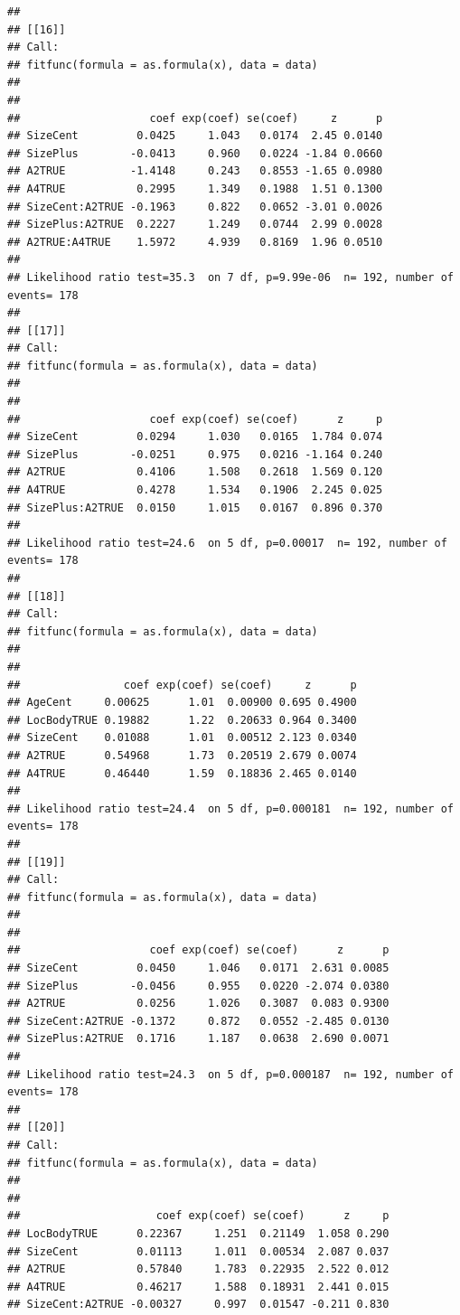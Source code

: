\documentclass{article}\usepackage[]{graphicx}\usepackage[]{color}
\makeatletter
\newenvironment{kframe}{%
 \def\at@end@of@kframe{}%
 \ifinner\ifhmode%
  \def\at@end@of@kframe{\end{minipage}}%
  \begin{minipage}{\columnwidth}%
 \fi\fi%
 \def\FrameCommand##1{\hskip\@totalleftmargin \hskip-\fboxsep
 \colorbox{shadecolor}{##1}\hskip-\fboxsep
     \hskip-\linewidth \hskip-\@totalleftmargin \hskip\columnwidth}%
 \MakeFramed {\advance\hsize-\width
   \@totalleftmargin\z@ \linewidth\hsize
   \@setminipage}}%
 {\par\unskip\endMakeFramed%
 \at@end@of@kframe}
\newenvironment{knitrout}{}{} %
\makeatother
\begin{document}
\begin{knitrout}
\begin{kframe}
\begin{verbatim}
## 
## [[16]]
## Call:
## fitfunc(formula = as.formula(x), data = data)
## 
## 
##                    coef exp(coef) se(coef)     z      p
## SizeCent         0.0425     1.043   0.0174  2.45 0.0140
## SizePlus        -0.0413     0.960   0.0224 -1.84 0.0660
## A2TRUE          -1.4148     0.243   0.8553 -1.65 0.0980
## A4TRUE           0.2995     1.349   0.1988  1.51 0.1300
## SizeCent:A2TRUE -0.1963     0.822   0.0652 -3.01 0.0026
## SizePlus:A2TRUE  0.2227     1.249   0.0744  2.99 0.0028
## A2TRUE:A4TRUE    1.5972     4.939   0.8169  1.96 0.0510
## 
## Likelihood ratio test=35.3  on 7 df, p=9.99e-06  n= 192, number of events= 178 
## 
## [[17]]
## Call:
## fitfunc(formula = as.formula(x), data = data)
## 
## 
##                    coef exp(coef) se(coef)      z     p
## SizeCent         0.0294     1.030   0.0165  1.784 0.074
## SizePlus        -0.0251     0.975   0.0216 -1.164 0.240
## A2TRUE           0.4106     1.508   0.2618  1.569 0.120
## A4TRUE           0.4278     1.534   0.1906  2.245 0.025
## SizePlus:A2TRUE  0.0150     1.015   0.0167  0.896 0.370
## 
## Likelihood ratio test=24.6  on 5 df, p=0.00017  n= 192, number of events= 178 
## 
## [[18]]
## Call:
## fitfunc(formula = as.formula(x), data = data)
## 
## 
##                coef exp(coef) se(coef)     z      p
## AgeCent     0.00625      1.01  0.00900 0.695 0.4900
## LocBodyTRUE 0.19882      1.22  0.20633 0.964 0.3400
## SizeCent    0.01088      1.01  0.00512 2.123 0.0340
## A2TRUE      0.54968      1.73  0.20519 2.679 0.0074
## A4TRUE      0.46440      1.59  0.18836 2.465 0.0140
## 
## Likelihood ratio test=24.4  on 5 df, p=0.000181  n= 192, number of events= 178 
## 
## [[19]]
## Call:
## fitfunc(formula = as.formula(x), data = data)
## 
## 
##                    coef exp(coef) se(coef)      z      p
## SizeCent         0.0450     1.046   0.0171  2.631 0.0085
## SizePlus        -0.0456     0.955   0.0220 -2.074 0.0380
## A2TRUE           0.0256     1.026   0.3087  0.083 0.9300
## SizeCent:A2TRUE -0.1372     0.872   0.0552 -2.485 0.0130
## SizePlus:A2TRUE  0.1716     1.187   0.0638  2.690 0.0071
## 
## Likelihood ratio test=24.3  on 5 df, p=0.000187  n= 192, number of events= 178 
## 
## [[20]]
## Call:
## fitfunc(formula = as.formula(x), data = data)
## 
## 
##                     coef exp(coef) se(coef)      z     p
## LocBodyTRUE      0.22367     1.251  0.21149  1.058 0.290
## SizeCent         0.01113     1.011  0.00534  2.087 0.037
## A2TRUE           0.57840     1.783  0.22935  2.522 0.012
## A4TRUE           0.46217     1.588  0.18931  2.441 0.015
## SizeCent:A2TRUE -0.00327     0.997  0.01547 -0.211 0.830

\end{verbatim}
\end{kframe}
\end{knitrout}
\end{document}
